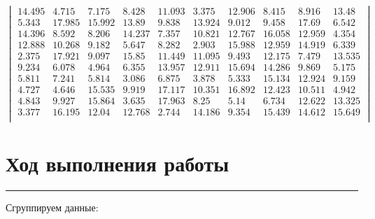 \documentclass[a4paper, 14pt]{extarticle}
\begin{document}
\begin{equation*}
    \begin{vmatrix}
        14.495 & 4.715 & 7.175 & 8.428 & 11.093 & 3.375 & 12.906 & 8.415 & 8.916 & 13.48 \\
        5.343 & 17.985 & 15.992 & 13.89 & 9.838 & 13.924 & 9.012 & 9.458 & 17.69 & 6.542 \\
        14.396 & 8.592 & 8.206 & 14.237 & 7.357 & 10.821 & 12.767 & 16.058 & 12.959 & 4.354 \\
        12.888 & 10.268 & 9.182 & 5.647 & 8.282 & 2.903 & 15.988 & 12.959 & 14.919 & 6.339 \\
        2.375 & 17.921 & 9.097 & 15.85 & 11.449 & 11.095 & 9.493 & 12.175 & 7.479 & 13.535 \\
        9.234 & 6.078 & 4.964 & 6.355 & 13.957 & 12.911 & 15.694 & 14.286 & 9.869 & 5.175 \\
        5.811 & 7.241 & 5.814 & 3.086 & 6.875 & 3.878 & 5.333 & 15.134 & 12.924 & 9.159 \\
        4.727 & 4.646 & 15.535 & 9.919 & 17.117 & 10.351 & 16.892 & 12.423 & 10.511 & 4.942 \\
        4.843 & 9.927 & 15.864 & 3.635 & 17.963 & 8.25 & 5.14 & 6.734 & 12.622 & 13.325 \\
        3.377 & 16.195 & 12.04 & 12.768 & 2.744 & 14.186 & 9.354 & 15.439 & 14.612 & 15.649 \\
    \end{vmatrix}
\end{equation*}

\newpage

\section*{Ход выполнения работы}\vspace{-20pt}\rule{\linewidth}{0.1mm}

Сгруппируем данные:
\end{document}
